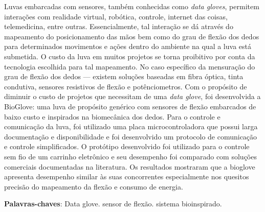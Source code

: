 \documentclass[
	12pt,				%
	openright,			%
	oneside,			%
	a4paper,			%
	english,			%
	brazil				%
	]{abntex2}
\begin{document}

\setlength{\absparsep}{18pt} %
\begin{resumo}
	\hspace{1.5cm}Luvas embarcadas com sensores, também conhecidas como \textit{data gloves}, permitem interações com realidade virtual, robótica, controle, internet das coisas, telemedicina, entre outras. Essencialmente, tal interação se dá através do mapeamento do posicionamento das mãos bem como do grau de flexão dos dedos para determinados movimentos e ações dentro do ambiente na qual a luva está submetida. O custo da luva em muitos projetos se torna proibitivo por conta da tecnologia escolhida para tal mapeamento. No caso específico da  mensuração do grau de flexão dos dedos --- existem soluções baseadas em fibra óptica, tinta condutiva, sensores resistivos de flexão e potênciometros. Com o propósito de diminuir o custo de projetos que necessitam de uma \textit{data glove}, foi desenvolvida a BioGlove: uma luva de propósito genérico com sensores de flexão embarcados de baixo custo e inspirados na biomecânica dos dedos. Para o controle e comunicação da luva, foi utilizado uma placa microcontroladora que possui larga documentação e disponibilidade e foi desenvolvido um protocolo de comunicação e controle simplificados. O protótipo desenvolvido foi utilizado para o controle sem fio de um carrinho eletrônico e seu desempenho foi comparado com soluções comerciais documentadas na literatura. Os resultados mostraram que a bioglove apresenta desempenho similar às suas concorrentes especialmente nos quesitos precisão do mapeamento da flexão e consumo de energia.
 
 \textbf{Palavras-chaves}: Data glove. sensor de flexão. sistema bioinspirado.
\end{resumo}
\end{document}
